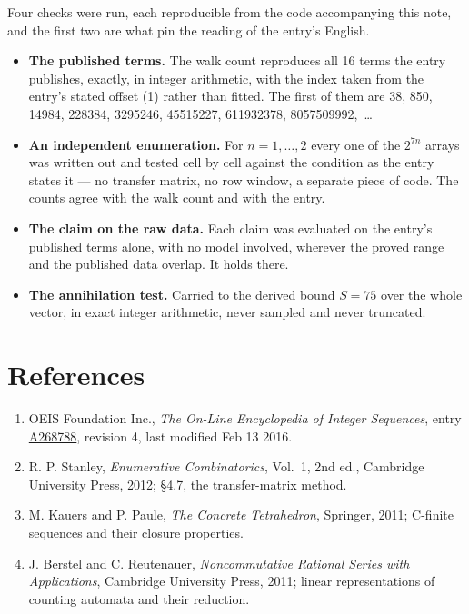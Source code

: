 \documentclass[11pt]{article}
\theoremstyle{definition}
\begin{document}
Four checks were run, each reproducible from the code accompanying this note, and the first two are what pin the reading of the entry's English.

\begin{itemize}

\item {\bfseries The published terms.} The walk count reproduces all 16 terms the entry publishes, exactly, in integer arithmetic, with the index taken from the entry's stated offset (1) rather than fitted. The first of them are 38, 850, 14984, 228384, 3295246, 45515227, 611932378, 8057509992,~\dots

\item {\bfseries An independent enumeration.} For $n = 1,\dots,2$ every one of the $2^{7n}$ arrays was written out and tested cell by cell against the condition as the entry states it --- no transfer matrix, no row window, a separate piece of code. The counts agree with the walk count and with the entry.

\item {\bfseries The claim on the raw data.} Each claim was evaluated on the entry's published terms alone, with no model involved, wherever the proved range and the published data overlap. It holds there.

\item {\bfseries The annihilation test.} Carried to the derived bound $S = 75$ over the whole vector, in exact integer arithmetic, never sampled and never truncated.

\end{itemize}

\section{References}

\begin{enumerate}

\item OEIS Foundation Inc., \emph{The On-Line Encyclopedia of Integer Sequences}, entry \href{https://oeis.org/A268788}{A268788}, revision 4, last modified Feb 13 2016.

\item R. P. Stanley, \emph{Enumerative Combinatorics}, Vol.~1, 2nd ed., Cambridge University Press, 2012; \S4.7, the transfer-matrix method.

\item M. Kauers and P. Paule, \emph{The Concrete Tetrahedron}, Springer, 2011; C-finite sequences and their closure properties.

\item J. Berstel and C. Reutenauer, \emph{Noncommutative Rational Series with Applications}, Cambridge University Press, 2011; linear representations of counting automata and their reduction.

\end{enumerate}
\end{document}
